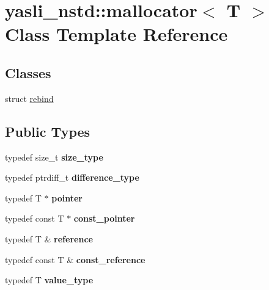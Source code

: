 \hypertarget{classyasli__nstd_1_1mallocator}{}\section{yasli\+\_\+nstd\+:\+:mallocator$<$ T $>$ Class Template Reference}
\label{classyasli__nstd_1_1mallocator}
\subsection*{Classes}
\begin{DoxyCompactItemize}
\item 
struct \hyperlink{structyasli__nstd_1_1mallocator_1_1rebind}{rebind}
\end{DoxyCompactItemize}
\subsection*{Public Types}
\begin{DoxyCompactItemize}
\item 
\hypertarget{classyasli__nstd_1_1mallocator_a8b6372bfb575b6e2f38c7768318b7643}{}typedef size\+\_\+t {\bfseries size\+\_\+type}\label{classyasli__nstd_1_1mallocator_a8b6372bfb575b6e2f38c7768318b7643}

\item 
\hypertarget{classyasli__nstd_1_1mallocator_a38088bd9b5e631d652c029f6e06ef552}{}typedef ptrdiff\+\_\+t {\bfseries difference\+\_\+type}\label{classyasli__nstd_1_1mallocator_a38088bd9b5e631d652c029f6e06ef552}

\item 
\hypertarget{classyasli__nstd_1_1mallocator_af618c005845c1ff0edbc9d1e155004b3}{}typedef T $\ast$ {\bfseries pointer}\label{classyasli__nstd_1_1mallocator_af618c005845c1ff0edbc9d1e155004b3}

\item 
\hypertarget{classyasli__nstd_1_1mallocator_afb26d37de14dce5daa16c0381dcd8e7a}{}typedef const T $\ast$ {\bfseries const\+\_\+pointer}\label{classyasli__nstd_1_1mallocator_afb26d37de14dce5daa16c0381dcd8e7a}

\item 
\hypertarget{classyasli__nstd_1_1mallocator_a1099138671685ac294a3f3b492a58f37}{}typedef T \& {\bfseries reference}\label{classyasli__nstd_1_1mallocator_a1099138671685ac294a3f3b492a58f37}

\item 
\hypertarget{classyasli__nstd_1_1mallocator_a8b3637cce73b249a41a7798742fbffa8}{}typedef const T \& {\bfseries const\+\_\+reference}\label{classyasli__nstd_1_1mallocator_a8b3637cce73b249a41a7798742fbffa8}

\item 
\hypertarget{classyasli__nstd_1_1mallocator_a65b23a39cc75fcd207270c8979a6d8ae}{}typedef T {\bfseries value\+\_\+type}\label{classyasli__nstd_1_1mallocator_a65b23a39cc75fcd207270c8979a6d8ae}

\end{DoxyCompactItemize}
